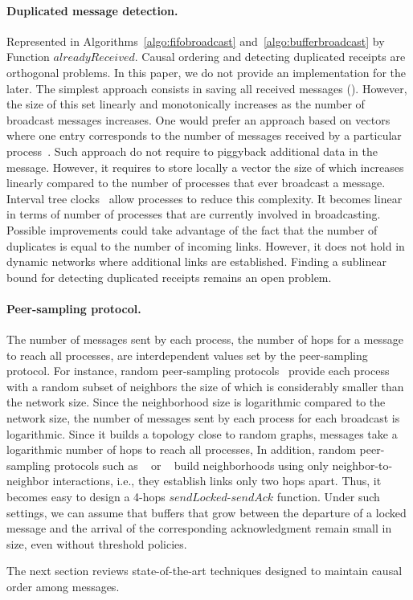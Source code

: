 \paragraph{Duplicated message detection.} Represented in
Algorithms~\ref{algo:fifobroadcast} and~\ref{algo:bufferbroadcast} by Function
$alreadyReceived$. Causal ordering and detecting duplicated receipts are
orthogonal problems. In this paper, we do not provide an implementation for the
later. The simplest approach consists in saving all received messages
(\REF). However, the size of this set linearly and monotonically increases as
the number of broadcast messages increases. One would prefer an approach based
on vectors where one entry corresponds to the number of messages received by a
particular process~\cite{fidge1988timestamps}. Such approach do not require to
piggyback additional data in the message. However, it requires to store locally
a vector the size of which increases linearly compared to the number of
processes that ever broadcast a message. Interval tree
clocks~\cite{almeida2008interval} allow processes to reduce this complexity. It
becomes linear in terms of number of processes that are currently involved in
broadcasting. Possible improvements could take advantage of the fact that the
number of duplicates is equal to the number of incoming links. However, it does
not hold in dynamic networks where additional links are established. Finding a
sublinear bound for detecting duplicated receipts remains an open problem.


\paragraph{Peer-sampling protocol.} The number of messages sent by each process,
the number of hops for a message to reach all processes,  are
interdependent values set by the peer-sampling protocol. For instance, random
peer-sampling protocols~\cite{jelasity2007gossip} provide each process with a
random subset of neighbors the size of which is considerably smaller than the
network size. Since the neighborhood size is logarithmic compared to the network
size, the number of messages sent by each process for each broadcast is
logarithmic. Since it builds a topology close to random graphs, messages take a
logarithmic number of hops to reach all processes,   In addition,
random peer-sampling protocols such as \SPRAY~\cite{nedelec2017adaptive} or
\CYCLON~\cite{voulgaris2005cyclon} build neighborhoods using only
neighbor-to-neighbor interactions, i.e., they establish links only two hops
apart. Thus, it becomes easy to design a 4-hops $sendLocked$-$sendAck$
function. Under such settings, we can assume that buffers that grow between the
departure of a locked message and the arrival of the corresponding
acknowledgment remain small in size, even without threshold policies.

The next section reviews state-of-the-art techniques designed to maintain causal
order among messages.

